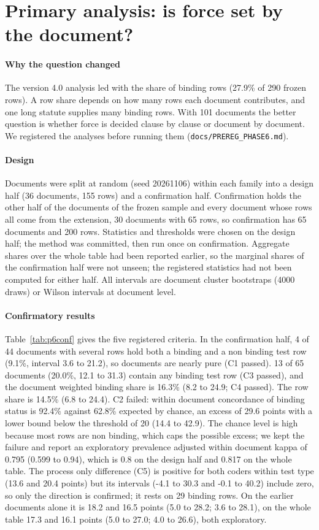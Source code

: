 \documentclass[conference]{IEEEtran}
\begin{document}
\section{Primary analysis: is force set by the document?}\label{sec:primary}
\paragraph{Why the question changed} The version 4.0 analysis led with the share of binding rows (27.9\% of 290 frozen rows). A row share depends on how many rows each document contributes, and one long statute supplies many binding rows. With 101 documents the better question is whether force is decided clause by clause or document by document. We registered the analyses before running them (\texttt{docs/PREREG\_PHASE6.md}).
\paragraph{Design} Documents were split at random (seed 20261106) within each family into a design half (36 documents, 155 rows) and a confirmation half. Confirmation holds the other half of the documents of the frozen sample and every document whose rows all come from the extension, 30 documents with 65 rows, so confirmation has 65 documents and 200 rows. Statistics and thresholds were chosen on the design half; the method was committed, then run once on confirmation. Aggregate shares over the whole table had been reported earlier, so the marginal shares of the confirmation half were not unseen; the registered statistics had not been computed for either half. All intervals are document cluster bootstraps (4000 draws) or Wilson intervals at document level.
\paragraph{Confirmatory results} Table~\ref{tab:p6conf} gives the five registered criteria. In the confirmation half, 4 of 44 documents with several rows hold both a binding and a non binding test row (9.1\%, interval 3.6 to 21.2), so documents are nearly pure (C1 passed). 13 of 65 documents (20.0\%, 12.1 to 31.3) contain any binding test row (C3 passed), and the document weighted binding share is 16.3\% (8.2 to 24.9; C4 passed). The row share is 14.5\% (6.8 to 24.4). C2 failed: within document concordance of binding status is 92.4\% against 62.8\% expected by chance, an excess of 29.6 points with a lower bound below the threshold of 20 (14.4 to 42.9). The chance level is high because most rows are non binding, which caps the possible excess; we kept the failure and report an exploratory prevalence adjusted within document kappa of 0.795 (0.599 to 0.94), which is 0.8 on the design half and 0.817 on the whole table. The process only difference (C5) is positive for both coders within test type (13.6 and 20.4 points) but its intervals (-4.1 to 30.3 and -0.1 to 40.2) include zero, so only the direction is confirmed; it rests on 29 binding rows. On the earlier documents alone it is 18.2 and 16.5 points (5.0 to 28.2; 3.6 to 28.1), on the whole table 17.3 and 16.1 points (5.0 to 27.0; 4.0 to 26.6), both exploratory.
\end{document}

